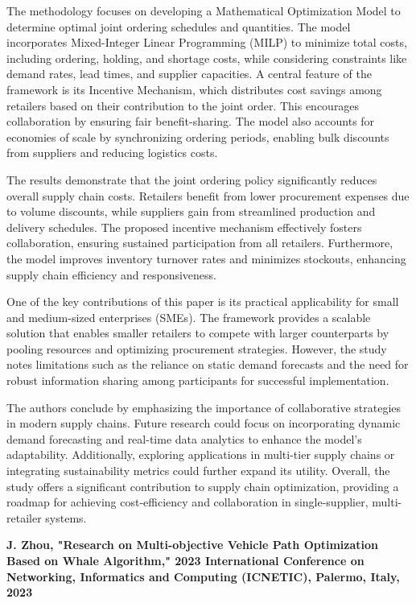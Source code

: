 The methodology focuses on developing a Mathematical Optimization Model to determine optimal joint ordering schedules and quantities. The model incorporates Mixed-Integer Linear Programming (MILP) to minimize total costs, including ordering, holding, and shortage costs, while considering constraints like demand rates, lead times, and supplier capacities. A central feature of the framework is its Incentive Mechanism, which distributes cost savings among retailers based on their contribution to the joint order. This encourages collaboration by ensuring fair benefit-sharing. The model also accounts for economies of scale by synchronizing ordering periods, enabling bulk discounts from suppliers and reducing logistics costs.

The results demonstrate that the joint ordering policy significantly reduces overall supply chain costs. Retailers benefit from lower procurement expenses due to volume discounts, while suppliers gain from streamlined production and delivery schedules. The proposed incentive mechanism effectively fosters collaboration, ensuring sustained participation from all retailers. Furthermore, the model improves inventory turnover rates and minimizes stockouts, enhancing supply chain efficiency and responsiveness.

One of the key contributions of this paper is its practical applicability for small and medium-sized enterprises (SMEs). The framework provides a scalable solution that enables smaller retailers to compete with larger counterparts by pooling resources and optimizing procurement strategies. However, the study notes limitations such as the reliance on static demand forecasts and the need for robust information sharing among participants for successful implementation.

The authors conclude by emphasizing the importance of collaborative strategies in modern supply chains. Future research could focus on incorporating dynamic demand forecasting and real-time data analytics to enhance the model's adaptability. Additionally, exploring applications in multi-tier supply chains or integrating sustainability metrics could further expand its utility. Overall, the study offers a significant contribution to supply chain optimization, providing a roadmap for achieving cost-efficiency and collaboration in single-supplier, multi-retailer systems.

\textbf{\cite{zhou2023whalealgorithm}J. Zhou, "Research on Multi-objective  Vehicle Path Optimization Based on Whale Algorithm," 2023 International Conference on Networking, Informatics and Computing (ICNETIC), Palermo, Italy, 2023}

